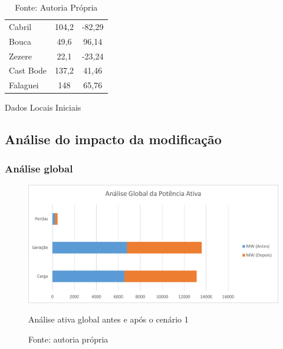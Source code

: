 \begin{table}[H]
\begin{tabular}{lcc}
Cabril                              & 104,2                                & -82,29        \\
Bouca                               & 49,6                                 & 96,14         \\
Zezere                              & 22,1                                 & -23,24        \\
Cast Bode                           & 137,2                                & 41,46         \\
Falaguei                            & 148                                  & 65,76        
\end{tabular}
\caption{Dados Locais Iniciais}
  \vspace{-3.5mm}
	\caption*{Fonte: Autoria Própria}
  \label{tab:DadosLocaisIniciais}
\end{table}


\subsection{Análise do impacto da modificação}


\subsubsection{Análise global}

\begin{figure}[H]
	\centering
	\captionsetup{width=\textwidth, font=footnotesize, textfont=bf}	
	\includegraphics[width=\linewidth]{img/global_MW_caso1.pdf}
	\caption{Análise ativa global antes e após o cenário 1}
	\vspace{-3.5mm}
	\caption*{Fonte: autoria própria}
	\label{fig:global_MW_caso1}
\end{figure}

